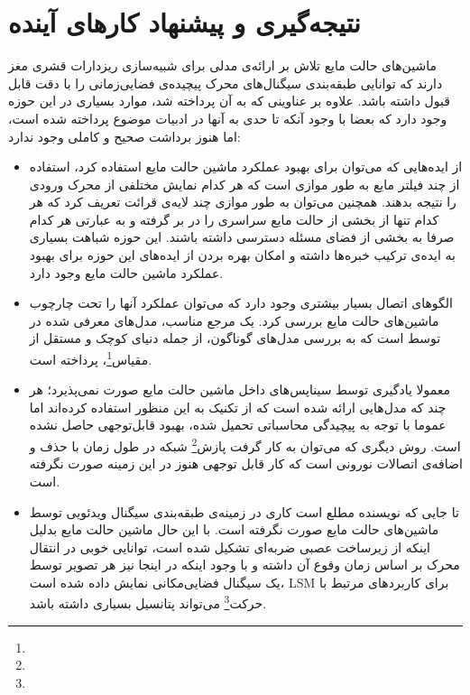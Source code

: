 \chapter{نتیجه‌گیری و پیشنهاد کارهای آینده}
ماشین‌های حالت مایع تلاش بر ارائه‌ی مدلی برای شبیه‌سازی ریزدارات قشری مغز دارند که توانایی طبقه‌بندی سیگنال‌های محرک پیچیده‌ی فضایی‌زمانی را با دقت قابل قبول داشته باشد. علاوه بر عناوینی که به آن پرداخته شد، موارد بسیاری در این حوزه وجود دارد که بعضا با وجود آنکه تا حدی به آنها در ادبیات موضوع پرداخته شده است، اما هنوز برداشت صحیح و کاملی وجود ندارد:

\begin{itemize}
\item
از ایده‌هایی که می‌توان برای بهبود عملکرد ماشین حالت مایع استفاده کرد، استفاده از چند فیلتر مایع به طور موازی است که هر کدام نمایش مختلفی از محرک ورودی را نتیجه بدهند. همچنین می‌توان به طور موازی چند لایه‌ی قرائت تعریف کرد که هر کدام تنها از بخشی از حالت مایع سراسری را در بر گرفته و به عبارتی هر کدام صرفا به بخشی از فضای مسئله دسترسی داشته باشند. این حوزه شباهت بسیاری به ایده‌ی ترکیب خبره‌ها داشته و امکان بهره بردن از ایده‌های این حوزه برای بهبود عملکرد ماشین حالت مایع وجود دارد.

\item
الگوهای اتصال بسیار بیشتری وجود دارد که می‌توان عملکرد آنها را تحت چارچوب ماشین‌های حالت مایع بررسی کرد. یک مرجع مناسب، مدل‌های معرفی شده در \cite{kaiser2011tutorial} توسط  است که به بررسی مدل‌های گوناگون، از جمله دنیای کوچک و مستقل از مقیاس\footnote{}، پرداخته است.

\item
معمولا یادگیری توسط سیناپس‌های داخل ماشین حالت مایع صورت نمی‌پذیرد؛ هر چند که مدل‌هایی ارائه شده است که از تکنیک  به این منظور استفاده کرده‌اند اما عموما با توجه به پیچیدگی محاسباتی تحمیل شده، بهبود قابل‌توجهی حاصل نشده است. روش دیگری که می‌توان به کار گرفت پازش\footnote{} شبکه در طول زمان با حذف و اضافه‌ی اتصالات نورونی است که کار قابل توجهی هنوز در این زمینه صورت نگرفته است.

\item
تا جایی که نویسنده مطلع است کاری در زمینه‌ی طبقه‌بندی سیگنال ویدئویی توسط ماشین‌های حالت مایع صورت نگرفته است. با این حال ماشین حالت مایع بدلیل اینکه از زیرساخت عصبی ضربه‌ای تشکیل شده است، توانایی خوبی در انتقال محرک بر اساس زمان وقوع آن داشته و با وجود اینکه در اینجا نیز هر تصویر توسط یک سیگنال فضایی‌مکانی نمایش داده شده است، LSM برای کاربردهای مرتبط با حرکت\footnote{} می‌تواند پتانسیل بسیاری داشته باشد.


\end{itemize}
